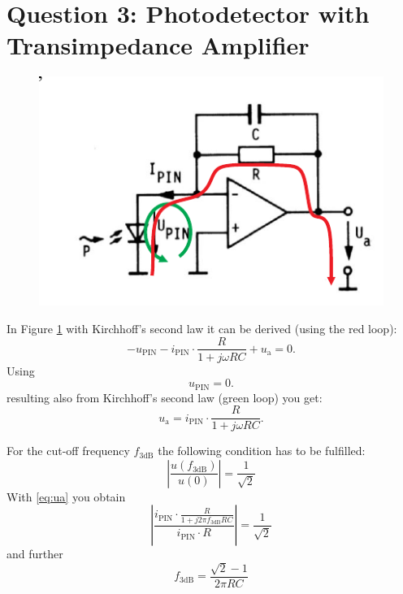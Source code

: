 
\section{Question 3: Photodetector with Transimpedance Amplifier}

\begin{figure}[h]%
\centering
\includegraphics[width=.8\columnwidth]{Grafiken/OPAMP_m.pdf}
\caption{}%
\label{fig:OPAMP}%

\end{figure}

In Figure \ref{fig:OPAMP} with Kirchhoff's second law it can be derived (using the red loop):
\begin{equation}
 - u_{\mathrm{PIN}} - i_{\mathrm{PIN}}\cdot \frac{R}{1+ j\omega RC}+u_{\mathrm{a}} = 0 .
\label{eq:masche1}
\end{equation}
Using
\begin{equation}
 u_{\mathrm{PIN}}=0.
\label{eq:masche2}
\end{equation}
resulting also from Kirchhoff's second law (green loop) you get:
\begin{equation}
 u_{\mathrm{a}} = i_{\mathrm{PIN}}\cdot \frac{R}{1+ j\omega RC}.
\label{eq:ua}
\end{equation}

For the cut-off frequency $f_{\mathrm{3dB}}$ the following condition has to be fulfilled:
\begin{equation}
 \left|\frac{u(f_{\mathrm{3dB}})}{u(0)}\right| = \frac{1}{\sqrt{2}}
\end{equation}
With \eqref{eq:ua} you obtain
\begin{equation}
 \left|\frac{i_{\mathrm{PIN}}\cdot \frac{R}{1+ j2\pi f_{\mathrm{3dB}} RC}}{i_{\mathrm{PIN}}\cdot R}\right| = \frac{1}{\sqrt{2}}
\end{equation}
and further
\begin{equation}
 f_{\mathrm{3dB}} = \frac{\sqrt{2}-1}{2\pi RC} 
\end{equation}

